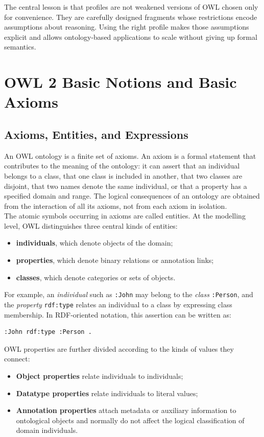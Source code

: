 \documentclass{scrbook}
\begin{document}
	The central lesson is that profiles are not weakened versions of OWL chosen only for convenience. They are carefully designed fragments whose restrictions encode assumptions about reasoning. Using the right profile makes those assumptions explicit and allows ontology-based applications to scale without giving up formal semantics.
	
	\chapter{OWL 2 Basic Notions and Basic Axioms}
	
	\section{Axioms, Entities, and Expressions}
	
	An OWL ontology is a finite set of axioms. An axiom is a formal statement that contributes to the meaning of the ontology: it can assert that an individual belongs to a class, that one class is included in another, that two classes are disjoint, that two names denote the same individual, or that a property has a specified domain and range. The logical consequences of an ontology are obtained from the interaction of all its axioms, not from each axiom in isolation.\\
	
	The atomic symbols occurring in axioms are called entities. At the modelling level, OWL distinguishes three central kinds of entities:
	\begin{itemize}
		\item \textbf{individuals}, which denote objects of the domain;
		\item \textbf{properties}, which denote binary relations or annotation links;
		\item \textbf{classes}, which denote categories or sets of objects.		
	\end{itemize}
	
	For example, an \emph{individual} such as \texttt{:John} may belong to the \emph{class} \texttt{:Person}, and the \emph{property} \texttt{rdf:type} relates an individual to a class by expressing class membership. In RDF-oriented notation, this assertion can be written as:
	\begin{lstlisting}
:John rdf:type :Person .
	\end{lstlisting}
	
	OWL properties are further divided according to the kinds of values they connect:
	\begin{itemize}
		\item \textbf{Object properties} relate individuals to individuals;
		\item \textbf{Datatype properties} relate individuals to literal values;
		\item \textbf{Annotation properties} attach metadata or auxiliary information to ontological objects and normally do not affect the logical classification of domain individuals.
	\end{itemize}
	
\end{document}

